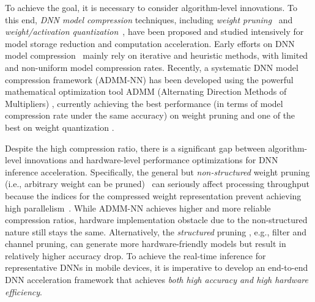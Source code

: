 \documentclass[sigplan,screen]{acmart}
\begin{document}
To achieve the goal, it is necessary to 
consider algorithm-level innovations. 
To this end, {\em DNN model compression} techniques, including \emph{weight pruning}~\cite{han2015learning,han2015deep,guo2016dynamic,dai2017nest,mao2017exploring,wen2016learning,he2017channel} and \emph{weight/activation quantization}~\cite{leng2017extremely,park2017weighted,zhou2017incremental,lin2016fixed,wu2016quantized,rastegari2016xnor,hubara2016binarized,courbariaux2015binaryconnect,courbariaux2016binarized,gupta2015deep,hubara2017quantized}, have been proposed and 
studied intensively for model storage reduction and computation acceleration. 
Early efforts on DNN model compression~\cite{han2015learning,han2015deep,guo2016dynamic,dai2017nest,mao2017exploring,wen2016learning,he2017channel} mainly rely on iterative and heuristic methods, with limited and non-uniform model compression rates.
Recently, a systematic DNN model compression framework (ADMM-NN) has been developed using the powerful mathematical optimization tool ADMM (Alternating Direction Methods of Multipliers) \cite{boyd2011distributed,hong2016convergence,liu2018zeroth}, currently achieving the best performance (in terms of model compression rate under the same accuracy) on weight pruning \cite{zhang2018systematic,ren2019ADMMNN} and one of the best on weight quantization \cite{leng2017extremely}. 



Despite the high compression ratio, 
there is a significant gap between algorithm-level innovations and hardware-level performance 
optimizations for DNN inference acceleration.
Specifically, the general but 
{\em non-structured} weight pruning 
(i.e., arbitrary weight can be pruned)~\cite{han2015learning,guo2016dynamic}
can seriously affect processing throughput
because the indices for the compressed 
weight representation prevent achieving
high parallelism~\cite{wen2016learning,he2017channel,mao2017exploring}.
While ADMM-NN achieves higher and more reliable
compression ratios, hardware implementation
obstacle due to the non-structured nature still stays the same. 
Alternatively, the {\em structured} pruning \cite{wen2016learning,he2017channel,mao2017exploring},
e.g., filter and channel pruning, can generate
more hardware-friendly models but result
in relatively higher accuracy drop.
To achieve the real-time inference for
representative DNNs in mobile devices,
it is imperative to develop 
an end-to-end DNN acceleration framework 
that achieves {\em both high accuracy 
and high hardware efficiency}.
\end{document}
